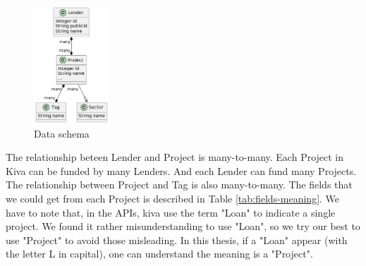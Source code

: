\begin{figure}[H]
    \centering
    \includegraphics[width=0.25\textwidth]{images/graphuml/dataschema.png}
    \caption{Data schema}
    \label{fig:data-schema}
\end{figure}

The relationship beteen Lender and Project is many-to-many.
Each Project in Kiva can be funded by many Lenders.
And each Lender can fund many Projects.
The relationship between Project and Tag is also many-to-many.
The fields that we could get from each Project is described in Table \ref{tab:fields-meaning}.
We have to note that, in the APIs, kiva use the term "Loan" to indicate a single project.
We found it rather misunderstanding to use "Loan", so we try our best to use "Project" to avoid those misleading.
In this thesis, if a "Loan" appear (with the letter L in capital), one can understand the meaning is a "Project".


